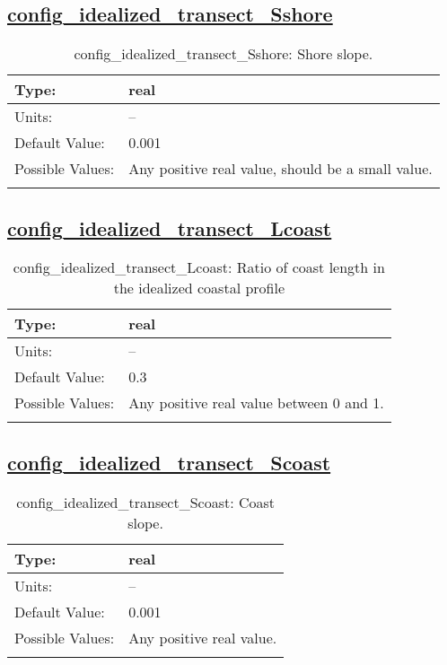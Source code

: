 \subsection[config\_idealized\_transect\_Sshore]{\hyperref[sec:nm_tab_tidal_boundary]{config\_idealized\_transect\_Sshore}}
\label{subsec:nm_sec_config_idealized_transect_Sshore}
\begin{center}
\begin{longtable}{| p{2.0in} || p{4.0in} |}
    \hline
    Type: & real \\
    \hline
    Units: & -- \\
    \hline
    Default Value: & 0.001 \\
    \hline
    Possible Values: & Any positive real value, should be a small value. \\
    \hline
    \caption{config\_idealized\_transect\_Sshore: Shore slope.}
\end{longtable}
\end{center}
\subsection[config\_idealized\_transect\_Lcoast]{\hyperref[sec:nm_tab_tidal_boundary]{config\_idealized\_transect\_Lcoast}}
\label{subsec:nm_sec_config_idealized_transect_Lcoast}
\begin{center}
\begin{longtable}{| p{2.0in} || p{4.0in} |}
    \hline
    Type: & real \\
    \hline
    Units: & -- \\
    \hline
    Default Value: & 0.3 \\
    \hline
    Possible Values: & Any positive real value between 0 and 1. \\
    \hline
    \caption{config\_idealized\_transect\_Lcoast: Ratio of coast length in the idealized coastal profile}
\end{longtable}
\end{center}
\subsection[config\_idealized\_transect\_Scoast]{\hyperref[sec:nm_tab_tidal_boundary]{config\_idealized\_transect\_Scoast}}
\label{subsec:nm_sec_config_idealized_transect_Scoast}
\begin{center}
\begin{longtable}{| p{2.0in} || p{4.0in} |}
    \hline
    Type: & real \\
    \hline
    Units: & -- \\
    \hline
    Default Value: & 0.001 \\
    \hline
    Possible Values: & Any positive real value. \\
    \hline
    \caption{config\_idealized\_transect\_Scoast: Coast slope.}
\end{longtable}
\end{center}
